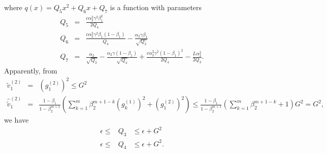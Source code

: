 \documentclass[twoside]{article}
\begin{document}
where $q(x) = Q_5 x^2 + Q_6 x + Q_7$ is a function with parameters
\begin{eqnarray}
Q_5 &=& \frac{c\alpha_2^2\gamma^2 \beta_1^2}{2Q_4} \nonumber\\
Q_6 &=& \frac{c\alpha_2^2\gamma^2\beta_1(1-\beta_1)}{Q_4}  - \frac{\alpha_2 \gamma \beta_1}{\sqrt{Q_2}}\nonumber\\
Q_7 &=& \frac{\alpha_2}{\sqrt{Q_3}} - \frac{\alpha_2\gamma(1-\beta_1)}{\sqrt{Q_4}} + \frac{c\alpha_2^2\gamma^2(1-\beta_1)^2}{2Q_4} - \frac{L\alpha_2^2}{2Q_3}.\nonumber
\end{eqnarray}
Apparently, from
\begin{eqnarray}
\widetilde v_1^{(2)} &=& \left(g_1^{(2)}\right)^2\leq G^2\nonumber\\
\hat{\widetilde v}_1^{(2)} &=& \frac{1-\beta_1}{1-\beta_2^{m+1}} \left(\sum_{k=1}^m \beta_2^{m + 1 - k} \left(g_k^{(1)}\right)^2 + \left(g_1^{(2)}\right)^2\right) \leq \frac{1-\beta_1}{1-\beta_2^{m+1}} \left(\sum_{k=1}^m \beta_2^{m + 1 - k}  + 1\right)G^2 = G^2\nonumber,
\end{eqnarray}
we have
\begin{eqnarray}
\epsilon \leq &Q_3& \leq \epsilon + G^2\nonumber\\
\epsilon \leq &Q_4& \leq \epsilon + G^2.\nonumber
\end{eqnarray}
\end{document}
